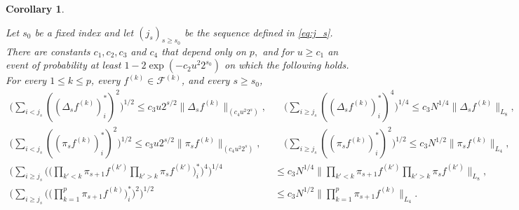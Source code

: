 \documentclass[numbers,webpdf,imaiai]{ima-authoring-template}
\theoremstyle{thmstyletwo}%
\newtheorem{corollary}[theorem]{Corollary}
\numberwithin{equation}{section}
\numberwithin{equation}{section}
\newcommand{\F}{\mathcal{F}}
\begin{document}
\begin{corollary}\label{coro:1}


Let $s_0$ be a fixed index and let $(j_s)_{s\ge s_0}$ be the sequence defined in \eqref{eq:j_s}.   There are constants $c_1, c_2, c_3$ and $c_4$ that depend only on $p,$ and for $u\ge c_1$ an event of probability at least $1-2 \exp \left(-c_2 u^2 2^{s_0}\right)$ on which the following holds. For every $1\le k\le p$, every $f^{(k)} \in \F^{(k)}$, and every $s\ge s_0$,
\begin{align*}
\bigg(\sum_{i<j_{s}}\left(\left(\Delta_{s} f^{(k)}\right)_i^*\right)^2\bigg)^{1 / 2}
\le c_3 u 2^{s / 2} \|\Delta_s f^{(k)}\|_{(c_4 u^2 2^s)}, & \quad  \bigg(\sum_{i\ge j_{s}}\left(\left(\Delta_{s} f^{(k)}\right)_i^*\right)^4\bigg)^{1 / 4} 
\le c_3 N^{1 / 4} \|\Delta_s f^{(k)}\|_{L_{8}},\\
\bigg(\sum_{i<j_{s}}\left(\left(\pi_{s} f^{(k)}\right)_i^*\right)^2\bigg)^{1 / 2}\le c_3 u 2^{s / 2}\|\pi_s f^{(k)}\|_{(c_4 u^2 2^s)},& \quad
\bigg(\sum_{i\ge j_{s}}\left(\left(\pi_{s} f^{(k)}\right)_i^*\right)^2\bigg)^{1 / 2}\le c_3 N^{1/2}\|\pi_{s}f^{(k)}\|_{L_4},
\\
\Bigg( \sum_{i\ge j_s}  \bigg(\bigg( \prod_{k'<k}\pi_{s+1} f^{(k')}\prod_{k'>k}\pi_{s} f^{(k')} \bigg)^*_{i}\bigg)^4\Bigg)^{1/4} &  \le c_3 N^{1/4} \bigg\|\prod_{k'<k}\pi_{s+1} f^{(k')}\prod_{k'>k}\pi_{s} f^{(k')}\bigg\|_{L_8},
\\
\Bigg( \sum_{i\ge j_s}  \bigg(\bigg( \prod_{k=1}^{p}\pi_{s+1} f^{(k)} \bigg)^*_{i}\bigg)^2\Bigg)^{1/2} &  \le c_3 N^{1/2} \bigg\|\prod_{k=1}^{p}\pi_{s+1} f^{(k)}\bigg\|_{L_4}.
\end{align*}

\end{corollary}
\end{document}
